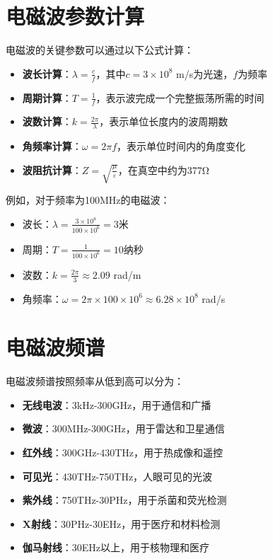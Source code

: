 \documentclass[12pt,UTF8]{ctexbook}
\begin{document}
\section{电磁波参数计算}

电磁波的关键参数可以通过以下公式计算：

\begin{itemize}[leftmargin=3.5em]
    \item \textbf{波长计算}：$\lambda = \frac{c}{f}$，其中$c=3\times10^8$ m/s为光速，$f$为频率
    \item \textbf{周期计算}：$T = \frac{1}{f}$，表示波完成一个完整振荡所需的时间
    \item \textbf{波数计算}：$k = \frac{2\pi}{\lambda}$，表示单位长度内的波周期数
    \item \textbf{角频率计算}：$\omega = 2\pi f$，表示单位时间内的角度变化
    \item \textbf{波阻抗计算}：$Z = \sqrt{\frac{\mu}{\varepsilon}}$，在真空中约为377Ω
\end{itemize}

例如，对于频率为100MHz的电磁波：
\begin{itemize}[leftmargin=3.5em]
    \item 波长：$\lambda = \frac{3\times10^8}{100\times10^6} = 3$米
    \item 周期：$T = \frac{1}{100\times10^6} = 10$纳秒
    \item 波数：$k = \frac{2\pi}{3} \approx 2.09$ rad/m
    \item 角频率：$\omega = 2\pi \times 100\times10^6 \approx 6.28\times10^8$ rad/s
\end{itemize}

\section{电磁波频谱}

电磁波频谱按照频率从低到高可以分为：

\begin{itemize}[leftmargin=3.5em]
    \item \textbf{无线电波}：3kHz-300GHz，用于通信和广播
    \item \textbf{微波}：300MHz-300GHz，用于雷达和卫星通信
    \item \textbf{红外线}：300GHz-430THz，用于热成像和遥控
    \item \textbf{可见光}：430THz-750THz，人眼可见的光波
    \item \textbf{紫外线}：750THz-30PHz，用于杀菌和荧光检测
    \item \textbf{X射线}：30PHz-30EHz，用于医疗和材料检测
    \item \textbf{伽马射线}：30EHz以上，用于核物理和医疗
\end{itemize}
\end{document}

